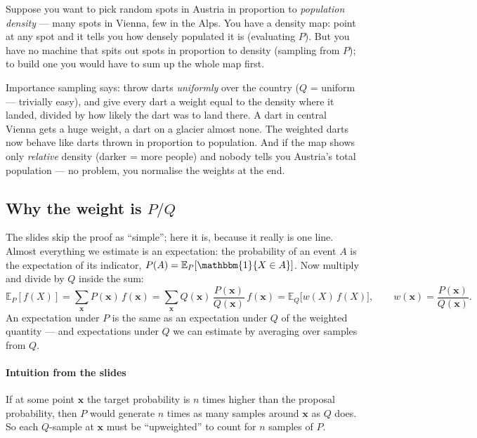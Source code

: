 \documentclass[11pt, oneside]{book}
\newcommand{\E}{\mathbb{E}}              %
\newcommand{\ind}{\mathbbm{1}}
\newcommand{\bx}{\mathbf{x}}  \newcommand{\by}{\mathbf{y}}
\let\originalsubsection\subsection
\renewcommand{\subsection}{\Needspace{6\baselineskip}\originalsubsection}
\begin{document}
\begin{intbox}[title={The dart-throwing picture}, unbreakable]
Suppose you want to pick random spots in Austria in proportion to
\emph{population density} --- many spots in Vienna, few in the Alps. You have
a density map: point at any spot and it tells you how densely populated it is
(evaluating $P$). But you have no machine that spits out spots in proportion
to density (sampling from $P$); to build one you would have to sum up the
whole map first.\par\smallskip
Importance sampling says: throw darts \emph{uniformly} over the country
($Q$ = uniform --- trivially easy), and give every dart a weight equal to the
density where it landed, divided by how likely the dart was to land there.
A dart in central Vienna gets a huge weight, a dart on a glacier almost none.
The weighted darts now behave like darts thrown in proportion to population.
And if the map shows only \emph{relative} density (darker = more people) and
nobody tells you Austria's total population --- no problem, you normalise the
weights at the end.
\end{intbox}

\subsection{Why the weight is \texorpdfstring{$P/Q$}{P/Q}}

The slides skip the proof as ``simple''; here it is, because it really is one
line. Almost everything we estimate is an expectation: the probability of an
event $A$ is the expectation of its indicator, $P(A) = \E_P[\ind\{X \in A\}]$.
Now multiply and divide by $Q$ inside the sum:
\[
\E_P[f(X)] = \sum_{\bx} P(\bx)\, f(\bx)
= \sum_{\bx} Q(\bx)\, \frac{P(\bx)}{Q(\bx)}\, f(\bx)
= \E_Q\big[w(X)\, f(X)\big], \qquad w(\bx) = \frac{P(\bx)}{Q(\bx)} .
\]
An expectation under $P$ is the same as an expectation under $Q$ of the
weighted quantity --- and expectations under $Q$ we can estimate by averaging
over samples from $Q$.

\paragraph{Intuition from the slides} If at some point $\bx$ the target
probability is $n$ times higher than the proposal probability, then $P$ would
generate $n$ times as many samples around $\bx$ as $Q$ does. So each
$Q$-sample at $\bx$ must be ``upweighted'' to count for $n$ samples of $P$.
\end{document}
